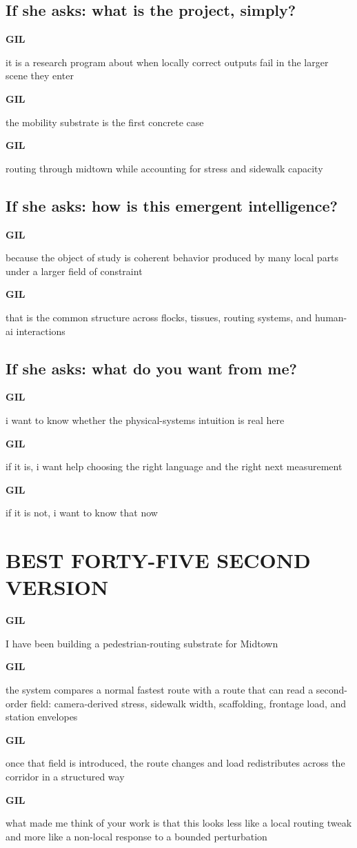 \documentclass[11pt,letterpaper]{article}
\newcommand{\gil}[1]{\par\smallskip\textbf{GIL}\par #1}
\begin{document}
\subsection*{If she asks: what is the project, simply?}

\gil{it is a research program about when locally correct outputs fail in the larger scene they enter}

\gil{the mobility substrate is the first concrete case}

\gil{routing through midtown while accounting for stress and sidewalk capacity}

\subsection*{If she asks: how is this emergent intelligence?}

\gil{because the object of study is coherent behavior produced by many local parts under a larger field of constraint}

\gil{that is the common structure across flocks, tissues, routing systems, and human-ai interactions}

\subsection*{If she asks: what do you want from me?}

\gil{i want to know whether the physical-systems intuition is real here}

\gil{if it is, i want help choosing the right language and the right next measurement}

\gil{if it is not, i want to know that now}

\section*{BEST FORTY-FIVE SECOND VERSION}

\gil{I have been building a pedestrian-routing substrate for Midtown}

\gil{the system compares a normal fastest route with a route that can read a second-order field: camera-derived stress, sidewalk width, scaffolding, frontage load, and station envelopes}

\gil{once that field is introduced, the route changes and load redistributes across the corridor in a structured way}

\gil{what made me think of your work is that this looks less like a local routing tweak and more like a non-local response to a bounded perturbation}
\end{document}

